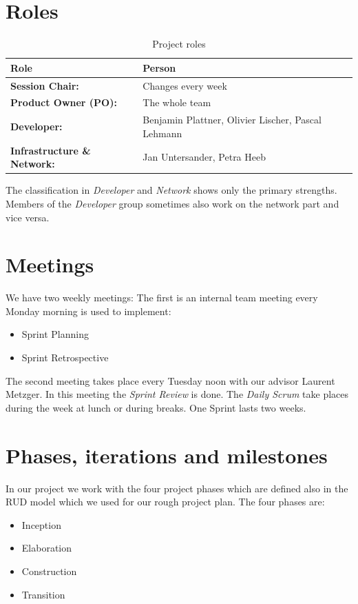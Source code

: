 \section{Roles}
\label{roles}

\begin{table}[h]
    \centering
    \caption{Project roles}
    \label{tab:project-roles}
    \begin{tabular}{l|l}
        \textbf{Role} & \textbf{Person}\\ \hline
        \textbf{Session Chair:} & Changes every week \\
        \textbf{Product Owner (PO):} & The whole team \\
        \textbf{Developer:} & Benjamin Plattner, Olivier Lischer, Pascal Lehmann\\
        \textbf{Infrastructure \& Network:} & Jan Untersander, Petra Heeb \\
    \end{tabular}
\end{table}

\noindent The classification in \textsl{Developer} and \textsl{Network} shows only the primary strengths.
Members of the \textsl{Developer} group sometimes also work on the network part and vice versa.


\section{Meetings}
\label{meetings}
We have two weekly meetings: \newline
The first is an internal team meeting every Monday morning is used to implement:
\begin{itemize}
  \item Sprint Planning
  \item Sprint Retrospective 
\end{itemize}

\noindent The second meeting takes place every Tuesday noon with our advisor Laurent Metzger.
In this meeting the \textsl{Sprint Review} is done.
\newline
\noindent The \textsl{Daily Scrum} take places during the week at lunch or during breaks.
One Sprint lasts two weeks.


\section{Phases, iterations and milestones}
\label{phases}
In our project we work with the four project phases which are defined also in the RUD model which we used for our rough project plan. The four phases are:
\begin{itemize}
    \item Inception
    \item Elaboration
    \item Construction
    \item Transition
\end{itemize}

